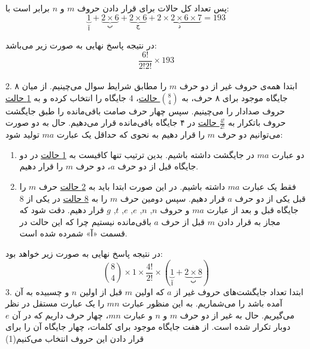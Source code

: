     \p
    پس تعداد کل حالات برای قرار دادن حروف 
    $m$ و $n$ 
     برابر است با:
    $$\underbrace{1}_{\text{آ}} + \underbrace{2\times 6}_{\text{ب}} + \underbrace{2\times 6}_{\text{ج}}+ \underbrace{2\times 2 \times 6 \times 7}_{\text{د}}‌=‌193$$
    
    \p
    در نتیجه پاسخ نهایی به صورت زیر می‌باشد:
    $$\frac{6!}{2!2!} \times 193$$
    \\2.
    \p
    ابتدا همه‌ی حروف غیر از دو حرف $m$ را مطابق شرایط سوال می‌چینیم.
    از میان ۸ جایگاه موجود برای ۸ حرف، به 
    \underline{${8\choose 4}$ حالت}، 
    4
   جایگاه را انتخاب کرده و به
   \underline{1 حالت}
   حروف صدادار را می‌چینیم.
    سپس چهار حرف صامت باقی‌مانده
    را طبق جایگشت حروف باتکرار به
     \underline{$\frac{4!}{2!}$ حالت}
    در ۴ جایگاه باقی‌مانده قرار می‌دهیم.
    حال به دو صورت می‌توانیم دو حرف $m$ را قرار دهیم به نحوی که حداقل یک عبارت 
    $ma$ تولید شود:
    \begin{enumerate}
      \item 

      دو عبارت  $ma$  در جایگشت داشته باشیم.
       بدین ترتیب تنها کافیست به 
      \underline{1 حالت}
       در دو جایگاه قبل از دو حرف 
       $a$،  
       دو حرف 
       $m$ را قرار دهیم.

      \item
      فقط یک عبارت $ma$ داشته‌ باشیم. 
      در این صورت ابتدا باید به
      \underline{2 حالت}
      حرف 
      $m$ 
      را قبل یکی از دو حرف 
      $a$ 
      قرار دهیم. 
      سپس
       دومین حرف
      $m$
      را
      به
      \underline{8 حالت}
      در یکی از 8 جایگاه قبل و بعد از عبارت 
      $ma$
       و حروف 
       $n$, 
       $n$, 
       $e$, 
       $e$, 
       $t$, 
       $g$ 
       قرار دهیم.
       دقت شود که مجاز به قرار دادن 
      $m$
      قبل از حرف 
      $a$ 
      باقی‌مانده 
      نیستیم چرا که این حالت در قسمت «آ» شمرده شده است.
    \end{enumerate}
    \p
    در نتیجه پاسخ نهایی به صورت زیر خواهد بود:
    $${8\choose 4} \times 1 \times \frac{4!}{2!} \times (\underbrace{1}_{\text{آ}} + \underbrace{2 \times 8}_{\text{ب}})$$
    3.
    \p
    ابتدا تعداد جایگشت‌های  حروف غیر از $a$ که اولین $m$ قبل از اولین $n$ و چسبیده به آن آمده ‌باشد را می‌شماریم.
    به این منظور عبارت $mn$ را یک عبارت مستقل در نظر می‌گیریم.
    حال به غیر از دو حرف $m$ و $n$ و عبارت
     $mn$، 
    چهار حرف داریم که در آن $e$ دوبار تکرار شده است.
    از هفت جایگاه موجود برای کلمات، چهار جایگاه آن را برای قرار دادن این حروف انتخاب می‌کنیم(1)
    
